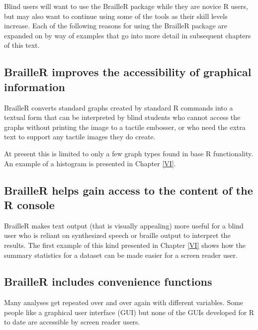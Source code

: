 \documentclass[
]{book}
\begin{document}
Blind users will want to use the BrailleR package while they are novice R users, but may also want to continue using some of the tools as their skill levels increase. Each of the following reasons for using the BrailleR package are expanded on by way of examples that go into more detail in subsequent chapters of this text.

\hypertarget{brailler-improves-the-accessibility-of-graphical-information}{%
\subsection{BrailleR improves the accessibility of graphical information}\label{brailler-improves-the-accessibility-of-graphical-information}}

BrailleR converts standard graphs created by standard R commands into a textual form that can
be interpreted by blind students who cannot access the graphs without
printing the image to a tactile embosser, or who need the extra text to
support any tactile images they do create.

At present this is limited to only a few graph types found in base R functionality. An example of a histogram is presented in Chapter \ref{VI}.

\hypertarget{brailler-helps-gain-access-to-the-content-of-the-r-console}{%
\subsection{BrailleR helps gain access to the content of the R console}\label{brailler-helps-gain-access-to-the-content-of-the-r-console}}

BrailleR makes text output (that is
visually appealing) more useful for a blind user who is reliant on
synthesized speech or braille output to interpret the results. The first example of this kind presented in Chapter \ref{VI} shows how the summary statistics for a dataset can be made easier for a screen reader user.

\hypertarget{brailler-includes-convenience-functions}{%
\subsection{BrailleR includes convenience functions}\label{brailler-includes-convenience-functions}}

Many analyses get repeated over and over again with different variables. Some people like a graphical user interface (GUI) but none of the GUIs developed for R to date are accessible by screen reader users.
\end{document}
